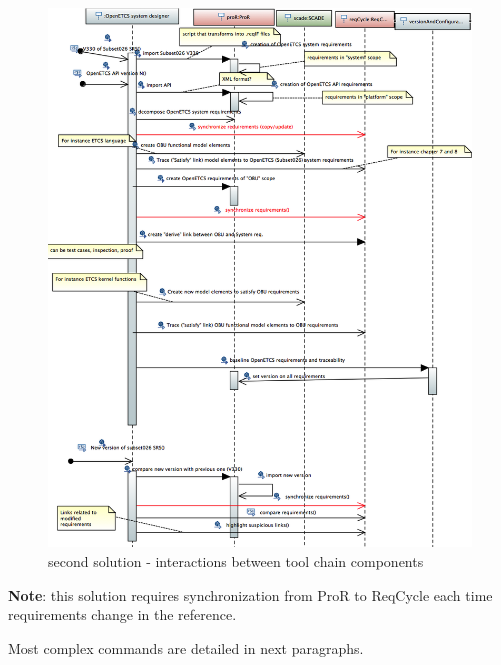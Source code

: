 \documentclass[11pt]{template/openetcs_report}
\begin{document}
\begin{figure}[tbp]
\centering
\includegraphics[width=1.0\linewidth]{images/second_trace_solution_interactions.png}
\caption{\label{fig:trace_second-interactions}second solution - interactions between tool chain components}
\end{figure}


\textbf{Note}: this solution requires synchronization from ProR to ReqCycle each time requirements change in the reference.
 
Most complex commands are detailed in next paragraphs.
\end{document}
